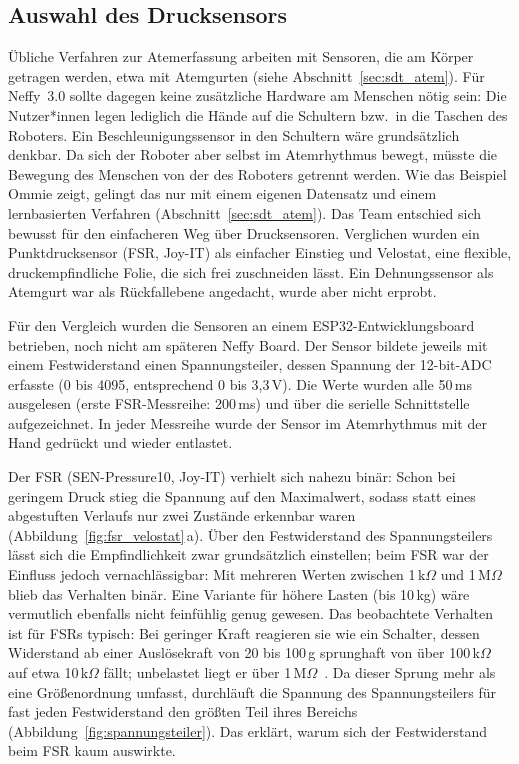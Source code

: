 \subsection{Auswahl des Drucksensors}
\label{sec:hw_drucksensor}

Übliche Verfahren zur Atemerfassung arbeiten mit Sensoren, die am Körper getragen werden,
etwa mit Atemgurten (siehe Abschnitt~\ref{sec:sdt_atem}). Für Neffy~3.0 sollte dagegen
keine zusätzliche Hardware am Menschen nötig sein: Die Nutzer*innen legen lediglich die
Hände auf die Schultern bzw.\ in die Taschen des Roboters. Ein Beschleunigungssensor in
den Schultern wäre grundsätzlich denkbar. Da sich der Roboter aber selbst im Atemrhythmus
bewegt, müsste die Bewegung des Menschen von der des Roboters getrennt werden. Wie das
Beispiel Ommie zeigt, gelingt das nur mit einem eigenen Datensatz und einem lernbasierten
Verfahren (Abschnitt~\ref{sec:sdt_atem}). Das Team entschied sich bewusst für den
einfacheren Weg über Drucksensoren. Verglichen wurden ein Punktdrucksensor (\ac{FSR}, Joy-IT)
als einfacher Einstieg und Velostat, eine flexible, druckempfindliche Folie, die sich frei
zuschneiden lässt. Ein Dehnungssensor als Atemgurt war als Rückfallebene angedacht, wurde aber
nicht erprobt.

Für den Vergleich wurden die Sensoren an einem ESP32-Entwicklungsboard betrieben, noch nicht
am späteren Neffy Board. Der Sensor bildete jeweils mit einem Festwiderstand einen
Spannungsteiler, dessen Spannung der 12-bit-\ac{ADC} erfasste (0 bis 4095, entsprechend
0 bis 3{,}3\,V). Die Werte wurden alle 50\,ms ausgelesen (erste \ac{FSR}-Messreihe: 200\,ms)
und über die serielle Schnittstelle aufgezeichnet. In jeder Messreihe wurde der Sensor im
Atemrhythmus mit der Hand gedrückt und wieder entlastet.

Der \ac{FSR} (SEN-Pressure10, Joy-IT) verhielt sich nahezu binär: Schon bei geringem Druck
stieg die Spannung auf den Maximalwert, sodass statt eines abgestuften Verlaufs nur zwei
Zustände erkennbar waren (Abbildung~\ref{fig:fsr_velostat}\,a). Über den Festwiderstand des
Spannungsteilers lässt sich die Empfindlichkeit zwar grundsätzlich einstellen; beim \ac{FSR}
war der Einfluss jedoch vernachlässigbar: Mit mehreren Werten zwischen 1\,k$\Omega$ und
1\,M$\Omega$ blieb das Verhalten binär. Eine Variante für höhere Lasten
(bis 10\,kg) wäre vermutlich ebenfalls nicht feinfühlig genug gewesen. Das beobachtete
Verhalten ist für \acp{FSR} typisch: Bei geringer Kraft reagieren sie wie ein Schalter, dessen
Widerstand ab einer Auslösekraft von 20 bis 100\,g sprunghaft von über 100\,k$\Omega$ auf etwa
10\,k$\Omega$ fällt; unbelastet liegt er über 1\,M$\Omega$~\cite{interlink2002fsr}. Da dieser
Sprung mehr als eine Größenordnung umfasst, durchläuft die Spannung des Spannungsteilers für fast
jeden Festwiderstand den größten Teil ihres Bereichs (Abbildung~\ref{fig:spannungsteiler}). Das
erklärt, warum sich der Festwiderstand beim \ac{FSR} kaum auswirkte.

